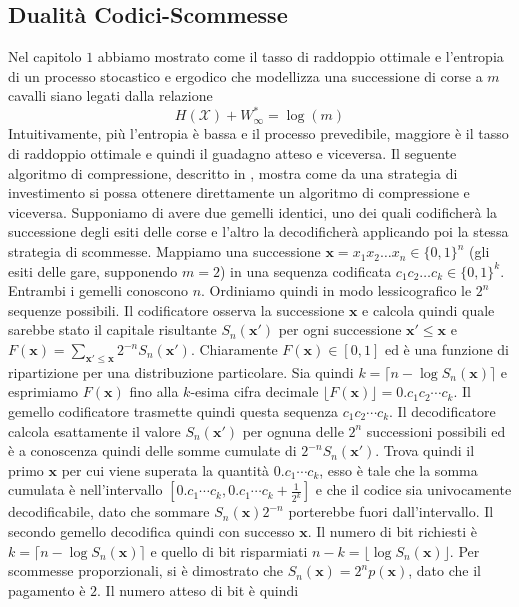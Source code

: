 \documentclass[a4paper,11pt]{book}
\theoremstyle{plain}
\theoremstyle{definition}
\theoremstyle{remark}
\newcommand{\x}{\bm{x}}
\begin{document}
\subsection{Dualità Codici-Scommesse}
Nel capitolo $1$ abbiamo mostrato come il tasso di raddoppio ottimale e l'entropia di un processo stocastico e ergodico che modellizza una successione di corse a $m$ cavalli siano legati dalla relazione
\begin{equation*}
	H(\mathcal{X})+W^*_\infty=\log(m)
\end{equation*}
Intuitivamente, più l'entropia è bassa e il processo prevedibile, maggiore è il tasso di raddoppio ottimale e quindi il guadagno atteso e viceversa.\newline
Il seguente algoritmo di compressione, descritto in \cite{CTElInfTeo}, mostra come da una strategia di investimento si possa ottenere direttamente un algoritmo di compressione e viceversa.\newline
Supponiamo di avere due gemelli identici, uno dei quali codificherà la successione degli esiti delle corse e l'altro la decodificherà applicando poi la stessa strategia di scommesse.\newline
Mappiamo una successione $\x=x_1x_2\ldots x_n\in\{0,1\}^n$ (gli esiti delle gare, supponendo $m=2$) in una sequenza codificata $c_1c_2\ldots c_k\in\{0,1\}^k$. Entrambi i gemelli conoscono $n$. Ordiniamo quindi in modo lessicografico le $2^n$ sequenze possibili. Il codificatore osserva la successione $\x$ e calcola quindi quale sarebbe stato il capitale risultante $S_n(\x')$ per ogni successione $\x'\leq \x$
e $F(\x) = \sum_{\x'\leq \x}2^{-n}S_n(\x')$. Chiaramente $F(\x)\in[0,1]$ ed è una funzione di ripartizione per una distribuzione particolare. Sia quindi $k=\lceil n-\log S_n(\x) \rceil$ e esprimiamo $F(\x)$ fino alla $k$-esima cifra decimale $\lfloor F(\x)\rfloor =0.c_1c_2\cdots c_k$. Il gemello codificatore trasmette quindi questa sequenza $c_1c_2\cdots c_k$.\newline
Il decodificatore calcola esattamente il valore $S_n(\x')$ per ognuna delle $2^n$ successioni possibili ed è a conoscenza quindi delle somme cumulate di $2^{-n}S_n(\x')$. Trova quindi il primo $\x$ per cui viene superata la quantità $0.c_1\cdots c_k$, esso è tale che la somma cumulata è nell'intervallo $[0.c_1\cdots c_k,0.c_1\cdots c_k+\frac{1}{2^k}]$ e che il codice sia univocamente decodificabile, dato che sommare $S_n(\x)2^{-n}$ porterebbe fuori dall'intervallo. Il secondo gemello decodifica quindi con successo $\x$. Il numero di bit richiesti è $k=\lceil n-\log S_n(\x) \rceil$ e quello di bit risparmiati $n-k = \lfloor \log S_n(\x)\rfloor$. Per scommesse proporzionali, si è dimostrato che $S_n(\x) = 2^n p(\x)$, dato che il pagamento è $2$. Il numero atteso di bit è quindi 
\end{document}
